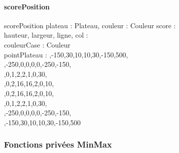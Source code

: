 	\paragraph{scorePosition}
		\begin{algorithme}
			\small
			\fonction
			{scorePosition}
			{plateau : Plateau, couleur : Couleur}
			{\entier}
			{
				score : \entier \\
				hauteur, largeur, ligne, col : \naturel \\
				couleurCase : Couleur \\
				pointPlateau : 
			}
			{
				{
					,-150,30,10,10,30,-150,500\rbrack, \\
    				,-250,0,0,0,0,-250,-150\rbrack, \\
    				,0,1,2,2,1,0,30\rbrack, \\
    				,0,2,16,16,2,0,10\rbrack, \\
    				,0,2,16,16,2,0,10\rbrack, \\
    				,0,1,2,2,1,0,30\rbrack, \\
    				,-250,0,0,0,0,-250,-150\rbrack, \\
    				,-150,30,10,10,30,-150,500\rbrack
				}
				{
					{
						{
						}
						{
							{
							}
						}
					}
				}
			}
		\end{algorithme}
		
	\subsubsection{Fonctions privées MinMax}
	
